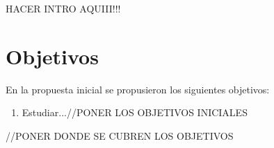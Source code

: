 HACER INTRO AQUIII!!!


\section{Objetivos}

En la propuesta inicial se propusieron los siguientes objetivos:

\begin{enumerate}
\item Estudiar...//PONER LOS OBJETIVOS INICIALES
\end{enumerate}

//PONER DONDE SE CUBREN LOS OBJETIVOS